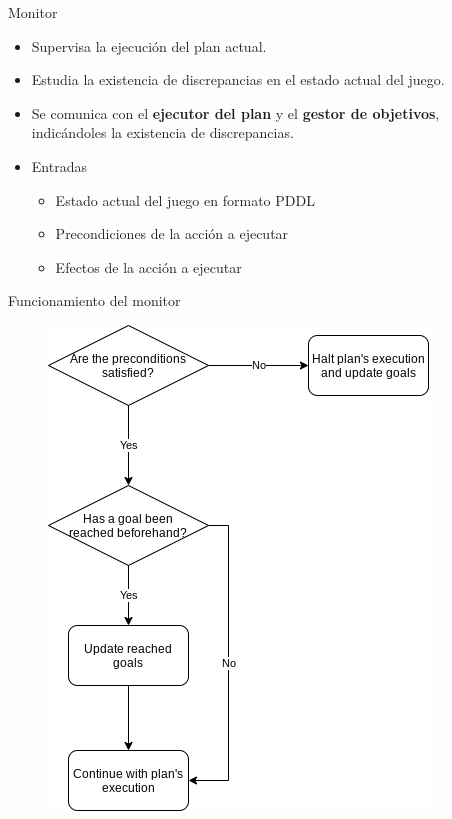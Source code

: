 \documentclass[11pt]{beamer}    %
\begin{document}
    \begin{frame}{Monitor}
        \begin{itemize}
            \item Supervisa la ejecución del plan actual.
            \item Estudia la existencia de \alert{discrepancias} en el estado actual del juego.
            \item Se comunica con el \textbf{ejecutor del plan} y el \textbf{gestor de objetivos},
            indicándoles la existencia de discrepancias.
            \item \alert{Entradas}
            \begin{itemize}
                \item Estado actual del juego en formato PDDL
                \item Precondiciones de la acción a ejecutar
                \item Efectos de la acción a ejecutar
            \end{itemize}
        \end{itemize}

    \end{frame}

    \begin{frame}{Funcionamiento del monitor}
        \begin{figure}
            \centering
            \includegraphics[scale=0.4]{img/presentation/monitor}
        \end{figure}
    \end{frame}
\end{document}
